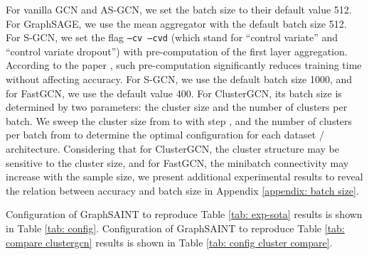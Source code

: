\documentclass{article} \usepackage{iclr2020_conference,times}
\newcommand{\graphsaint}{{\fontfamily{lmtt}\selectfont GraphSAINT}}
\begin{document}
For vanilla GCN and AS-GCN, we set the batch size to their default value 512. For GraphSAGE, we use the mean aggregator with the default batch size 512. For S-GCN, we set the flag \texttt{--cv --cvd} (which stand for ``control variate'' and ``control variate dropout'') with pre-computation of the first layer aggregation. According to the paper \citep{s-gcn}, such pre-computation significantly reduces training time without affecting accuracy. 
For S-GCN, we use the default batch size 1000, and for FastGCN, we use the default value 400.
For ClusterGCN, its batch size is determined by two parameters: the cluster size and the number of clusters per batch. We sweep the cluster size from  to  with step , and the number of clusters per batch from  to determine the optimal configuration for each dataset / architecture. 
Considering that for ClusterGCN, the cluster structure may be sensitive to the cluster size, and for FastGCN, the minibatch connectivity may increase with the sample size, we present additional experimental results to reveal the relation between accuracy and batch size in Appendix \ref{appendix: batch size}.


Configuration of {\graphsaint} to reproduce Table \ref{tab: exp-sota} results is shown in Table \ref{tab: config}.
Configuration of {\graphsaint} to reproduce Table \ref{tab: compare clustergcn} results is shown in Table \ref{tab: config cluster compare}.



\begin{table*}
\caption{Training configuration of {\graphsaint} for Table \ref{tab: compare clustergcn}}
    \centering
    \label{tab: config cluster compare}
\end{table*}
\end{document}
